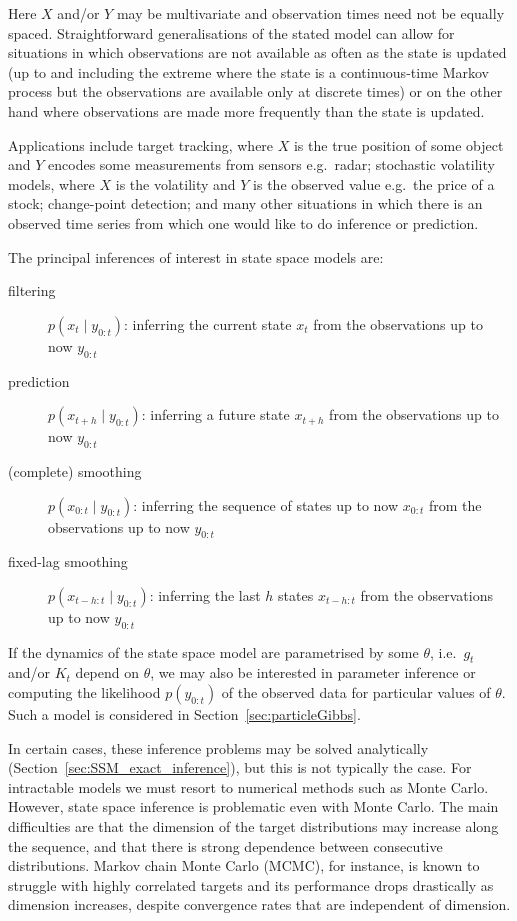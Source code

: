 Here $X$ and/or $Y$ may be multivariate and observation times need not be equally spaced. Straightforward generalisations of the stated model can allow for situations in which observations are not available as often as the state is updated (up to and including the extreme where the state is a continuous-time Markov process but the observations are available only at discrete times) or on the other hand where observations are made more frequently than the state is updated.

Applications include target tracking, where $X$ is the true position of some object and $Y$ encodes some measurements from sensors e.g.\ radar; stochastic volatility models, where $X$ is the volatility and $Y$ is the observed value e.g.\ the price of a stock; change-point detection; and many other situations in which there is an observed time series from which one would like to do inference or prediction.

The principal inferences of interest in state space models are:
\begin{description}
\item [filtering] $p(x_t\mid y_{0:t})$: inferring the current state $x_t$ from the observations up to now $y_{0:t}$
\item [prediction] $p(x_{t+h}\mid y_{0:t})$: inferring a future state $x_{t+h}$ from the observations up to now $y_{0:t}$
\item [(complete) smoothing] $p(x_{0:t}\mid y_{0:t})$: inferring the sequence of states up to now $x_{0:t}$ from the observations up to now $y_{0:t}$
\item [fixed-lag smoothing] $p(x_{t-h:t}\mid y_{0:t})$: inferring the last $h$ states $x_{t-h:t}$ from the observations up to now $y_{0:t}$
\end{description}
If the dynamics of the state space model are parametrised by some $\theta$, i.e.\ $g_t$ and/or $K_t$ depend on $\theta$, we may also be interested in parameter inference or computing the likelihood $p(y_{0:t})$ of the observed data for particular values of $\theta$. Such a model is considered in Section~\ref{sec:particleGibbs}.

In certain cases, these inference problems may be solved analytically (Section~\ref{sec:SSM_exact_inference}), but this is not typically the case. For intractable models we must resort to numerical methods such as Monte Carlo. However, state space inference is problematic even with Monte Carlo. 
The main difficulties are that the dimension of the target distributions may increase along the sequence, and that there is strong dependence between consecutive distributions. Markov chain Monte Carlo (MCMC), for instance, is known to struggle with highly correlated targets%
and its performance drops drastically as dimension increases, despite convergence rates that are independent of dimension.%

